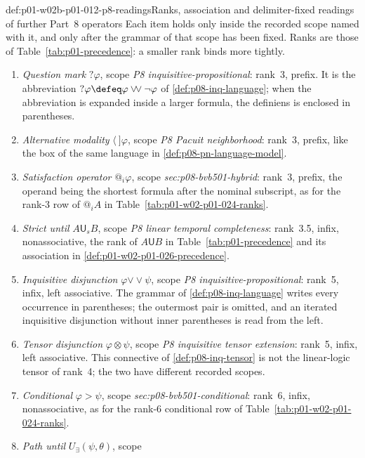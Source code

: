 \begin{hbconvention}{def:p01-w02b-p01-012-p8-readings}{Ranks, association and delimiter-fixed readings of further Part~8 operators}
Each item holds only inside the recorded scope named with it, and only
after the grammar of that scope has been fixed.  Ranks are those of
Table~\ref{tab:p01-precedence}: a smaller rank binds more tightly.
\begin{enumerate}
\item \emph{Question mark} \(?\varphi\), scope \emph{P8 inquisitive-propositional}:
  rank~3, prefix.  It is the abbreviation
  \(?\varphi\defeq\varphi\mathbin{\vee\!\vee}\neg\varphi\) of
  \cref{def:p08-inq-language}; when the abbreviation is expanded inside a
  larger formula, the definiens is enclosed in parentheses.
\item \emph{Alternative modality} \(\langle\ ]\varphi\), scope
  \emph{P8 Pacuit neighborhood}: rank~3, prefix, like the box of the same
  language in \cref{def:p08-pn-language-model}.
\item \emph{Satisfaction operator} \(@_i\varphi\), scope
  \emph{sec:p08-bvb501-hybrid}: rank~3, prefix, the operand being the
  shortest formula after the nominal subscript, as for the rank-3 row of
  \(@_iA\) in Table~\ref{tab:p01-w02-p01-024-ranks}.
\item \emph{Strict until} \(A\mathbin{\mathsf U_s}B\), scope
  \emph{P8 linear temporal completeness}: rank~3.5, infix, nonassociative,
  the rank of \(A\mathbin{\mathsf U}B\) in Table~\ref{tab:p01-precedence}
  and its association in \cref{def:p01-w02-p01-026-precedence}.
\item \emph{Inquisitive disjunction} \(\varphi\mathbin{\vee\!\vee}\psi\),
  scope \emph{P8 inquisitive-propositional}: rank~5, infix, left
  associative.  The grammar of \cref{def:p08-inq-language} writes every
  occurrence in parentheses; the outermost pair is omitted, and an
  iterated inquisitive disjunction without inner parentheses is read from
  the left.
\item \emph{Tensor disjunction} \(\varphi\otimes\psi\), scope
  \emph{P8 inquisitive tensor extension}: rank~5, infix, left associative.
  This connective of \cref{def:p08-inq-tensor} is not the linear-logic
  tensor of rank~4; the two have different recorded scopes.
\item \emph{Conditional} \(\varphi>\psi\), scope
  \emph{sec:p08-bvb501-conditional}: rank~6, infix, nonassociative, as for
  the rank-6 conditional row of Table~\ref{tab:p01-w02-p01-024-ranks}.
\item \emph{Path until} \(U_{\exists}(\psi,\theta)\), scope

\end{enumerate}
\end{hbconvention}
